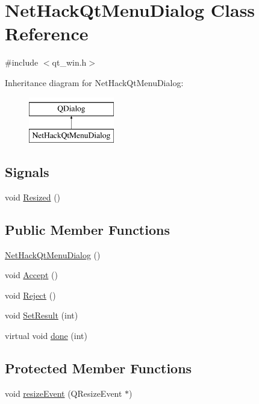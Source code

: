 \hypertarget{classNetHackQtMenuDialog}{\section{Net\+Hack\+Qt\+Menu\+Dialog Class Reference}
\label{classNetHackQtMenuDialog}
}


{\ttfamily \#include $<$qt\+\_\+win.\+h$>$}

Inheritance diagram for Net\+Hack\+Qt\+Menu\+Dialog\+:\begin{figure}[H]
\begin{center}
\leavevmode
\includegraphics[height=2.000000cm]{classNetHackQtMenuDialog}
\end{center}
\end{figure}
\subsection*{Signals}
\begin{DoxyCompactItemize}
\item 
void \hyperlink{classNetHackQtMenuDialog_a9d87cf041b20c48c38915986baae46e9}{Resized} ()
\end{DoxyCompactItemize}
\subsection*{Public Member Functions}
\begin{DoxyCompactItemize}
\item 
\hyperlink{classNetHackQtMenuDialog_a29c4743f83e136f3abb1fa1c57cb623c}{Net\+Hack\+Qt\+Menu\+Dialog} ()
\item 
void \hyperlink{classNetHackQtMenuDialog_a77c6670f0616d88dc10c8c9a772836de}{Accept} ()
\item 
void \hyperlink{classNetHackQtMenuDialog_a8559e3055d676329d64b4c8132213011}{Reject} ()
\item 
void \hyperlink{classNetHackQtMenuDialog_a25c01e87a2299719046ca31e715040b4}{Set\+Result} (int)
\item 
virtual void \hyperlink{classNetHackQtMenuDialog_a77a719aa819593c2bb5841f62e8a7a0d}{done} (int)
\end{DoxyCompactItemize}
\subsection*{Protected Member Functions}
\begin{DoxyCompactItemize}
\item 
void \hyperlink{classNetHackQtMenuDialog_a2db4ce113f5ddca55d83201243e84741}{resize\+Event} (Q\+Resize\+Event $\ast$)
\end{DoxyCompactItemize}



